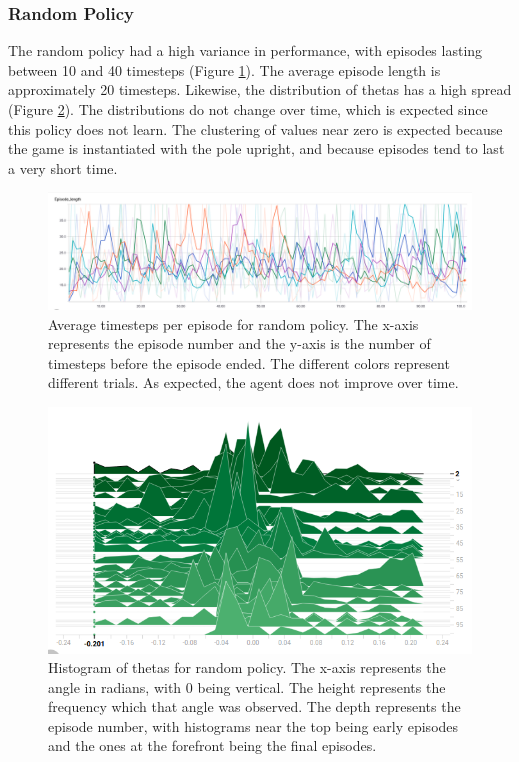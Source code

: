 \documentclass[12pt,a4paper]{article}
\begin{document}
\subsubsection*{Random Policy}

The random policy had a high variance in performance, with episodes lasting between 10 and 40 timesteps (Figure \ref{rand_ep_length}).  The average episode length is approximately 20 timesteps. Likewise, the distribution of thetas has a high spread (Figure \ref{rand_thetas}). The distributions do not change over time, which is expected since this policy does not learn. The clustering of values near zero is expected because the game is instantiated with the pole upright, and because episodes tend to last a very short time.

\begin{figure}[htbp]
\begin{center}
\includegraphics[width=\linewidth]{rand_ep_length.png}
\caption{Average timesteps per episode for random policy. The x-axis represents the episode number and the y-axis is the number of timesteps before the episode ended. The different colors represent different trials. As expected, the agent does not improve over time.}
\label{rand_ep_length}
\end{center}
\end{figure}

\begin{figure}[htbp]
\begin{center}
\includegraphics[width=\linewidth]{rand_thetas.png}
\caption{Histogram of thetas for random policy. The x-axis represents the angle in radians, with 0 being vertical. The height represents the frequency which that angle was observed. The depth represents the episode number, with histograms near the top being early episodes and the ones at the forefront being the final episodes.}
\label{rand_thetas}
\end{center}
\end{figure}
\end{document}
